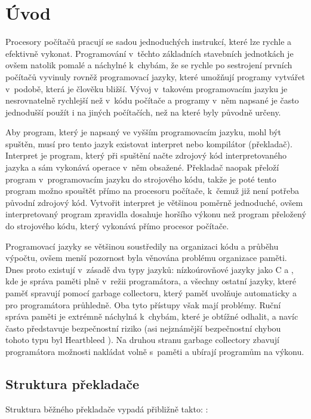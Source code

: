 \chapter{Úvod}

Procesory počítačů pracují se sadou jednoduchých instrukcí, které lze rychle a
efektivně vykonat. Programování v~těchto základních stavebních jednotkách je
ovšem natolik pomalé a náchylné k~chybám, že se rychle po sestrojení prvních
počítačů vyvinuly rovněž programovací jazyky, které umožňují programy vytvářet
v~podobě, která je člověku bližší. Vývoj v~takovém programovacím jazyku je
nesrovnatelně rychlejší než v~kódu počítače a programy v~něm napsané je často
jednodušší použít i na jiných počítačích, než na které byly původně určeny.

Aby program, který je napsaný ve vyšším programovacím jazyku, mohl být spuštěn,
musí pro tento jazyk existovat interpret nebo kompilátor (překladač). Interpret
je program, který při spuštění načte zdrojový kód interpretovaného jazyka a sám
vykonává operace v~něm obsažené. Překladač naopak přeloží program
v~programovacím jazyku do strojového kódu, takže je poté tento program možno
spouštět přímo na procesoru počítače, k~čemuž již není potřeba původní zdrojový
kód. Vytvořit interpret je většinou poměrně jednoduché, ovšem interpretovaný
program zpravidla dosahuje horšího výkonu než program přeložený do strojového
kódu, který vykonává přímo procesor počítače.

Programovací jazyky se většinou soustředily na organizaci kódu a průběhu
výpočtu, ovšem menší pozornost byla věnována problému organizace paměti. Dnes
proto existují v~zásadě dva typy jazyků: nízkoúrovňové jazyky jako C a
\Cplusplus, kde je správa paměti plně v~režii programátora, a všechny ostatní
jazyky, které paměť spravují pomocí garbage collectoru, který paměť uvolňuje
automaticky a pro programátora průhledně. Oba tyto přístupy však mají problémy.
Ruční správa paměti je extrémně náchylná k~chybám, které je obtížné odhalit, a
navíc často představuje bezpečnostní riziko (asi nejznámější bezpečnostní chybou
tohoto typu byl Heartbleed \cite{heartbleed}). Na druhou stranu garbage
collectory zbavují programátora možnosti nakládat volně s~paměti a ubírají
programům na výkonu.

\section{Struktura překladače}

Struktura běžného překladače vypadá přibližně takto:
\cite{grune2012modern,appel1998modern}:


